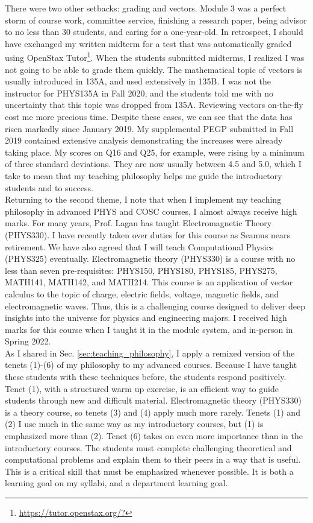 \documentclass[../../../main.tex]{subfiles}
\begin{document}
There were two other setbacks: grading and vectors.  Module 3 was a perfect storm of course work, committee service, finishing a research paper, being advisor to no less than 30 students, and caring for a one-year-old. In retrospect, I should have exchanged my written midterm for a test that was automatically graded using OpenStax Tutor\footnote{\url{https://tutor.openstax.org/?}}.  When the students submitted midterms, I realized I was not going to be able to grade them quickly.  The mathematical topic of vectors is usually introduced in 135A, and used extensively in 135B.  I was not the instructor for PHYS135A in Fall 2020, and the students told me with no uncertainty that this topic was dropped from 135A.  Reviewing vectors on-the-fly cost me more precious time.  Despite these cases, we can see that the data has risen markedly since January 2019.  My supplemental PEGP submitted in Fall 2019 contained extensive analysis demonstrating the increases were already taking place.  My scores on Q16 and Q25, for example, were rising by a minimum of three standard deviations.  They are now usually between 4.5 and 5.0, which I take to mean that my teaching philosophy helps me guide the introductory students and to success.
\\
\vspace{0.25cm}
Returning to the second theme, I note that when I implement my teaching philosophy in advanced PHYS and COSC courses, I almost always receive high marks.  For many years, Prof. Lagan has taught Electromagnetic Theory (PHYS330).  I have recently taken over duties for this course as Seamus nears retirement.  We have also agreed that I will teach Computational Physics (PHYS325) eventually.  Electromagnetic theory (PHYS330) is a course with no less than seven pre-requisites: PHYS150, PHYS180, PHYS185, PHYS275, MATH141, MATH142, and MATH214.  This course is an application of vector calculus to the topic of charge, electric fields, voltage, magnetic fields, and electromagnetic waves.  Thus, this is a challenging course designed to deliver deep insights into the universe for physics and engineering majors.  I received high marks for this course when I taught it in the module system, and in-person in Spring 2022.
\\
\vspace{0.25cm}
As I shared in Sec. \ref{sec:teaching_philosophy}, I apply a remixed version of the tenets (1)-(6) of my philosophy to my advanced courses.  Because I have taught these students with these techniques before, the students respond positively. Tenet (1), with a structured warm up exercise, is an efficient way to guide students through new and difficult material. Electromagnetic theory (PHYS330) is a theory course, so tenets (3) and (4) apply much more rarely.  Tenets (1) and (2) I use much in the same way as my introductory courses, but (1) is emphasized more than (2).  Tenet (6) takes on even more importance than in the introductory courses.  The students must complete challenging theoretical and computational problems and explain them to their peers in a way that is useful.  This is a critical skill that must be emphasized whenever possible.  It is both a learning goal on my syllabi, and a department learning goal.
\end{document}
